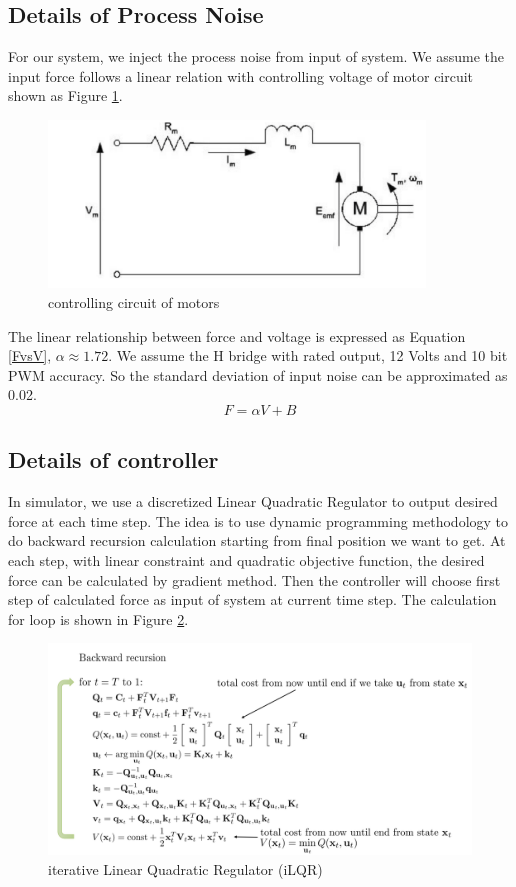 \documentclass{article}
\begin{document}
\subsection{Details of Process Noise}
For our system, we inject the process noise from input of system. We assume the input force follows a linear relation with controlling voltage of motor circuit shown as Figure \ref{fig:circuit}.
\begin{figure}[h!]
	\centering
	\includegraphics[width=10cm,keepaspectratio]{circuit.png}
	\caption{controlling circuit of motors}
	\label{fig:circuit}
\end{figure}
The linear relationship between force and voltage is expressed as Equation \ref{FvsV}, $\alpha \approx 1.72$. We assume the H bridge with rated output, 12 Volts and 10 bit PWM accuracy. So the standard deviation of input noise can be approximated as 0.02.
\begin{equation}
F = \alpha V + B
\label{FvsV}
\end{equation}
\subsection{Details of controller}
In simulator, we use a discretized Linear Quadratic Regulator to output desired force at each time step. The idea is to use dynamic programming methodology to do backward recursion calculation starting from final position we want to get. At each step, with linear constraint and quadratic objective function, the desired force can be calculated by gradient method. Then the controller will choose first step of calculated force as input of system at current time step. The calculation for loop is shown in Figure \ref{fig:iLQR}.
\begin{figure}[h!]
	\centering
	\includegraphics[width=15cm,keepaspectratio]{LQR.png}
	\caption{iterative Linear Quadratic Regulator (iLQR)}
	\label{fig:iLQR}
\end{figure}
\end{document}
